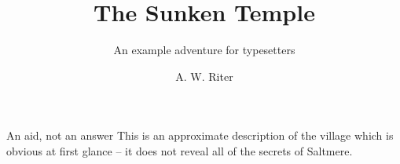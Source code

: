 \documentclass[theme=dnd]{rpghandout}
\title{The Sunken Temple}
\subtitle{An example adventure for typesetters}
\author{A. W. Riter}
\begin{document}
	\maketitle

	\begin{RpgSidebar}{An aid, not an answer}
		This is an approximate description of the village which is obvious at first glance -- it does not reveal all of the secrets of Saltmere.
	\end{RpgSidebar}

	
\end{document}
